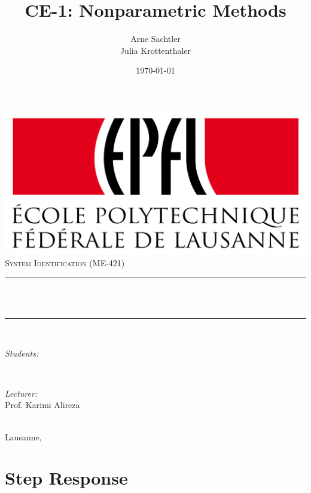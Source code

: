 \documentclass{scrartcl}
\begin{document}
\begin{titlepage}

\title{CE-1: Nonparametric Methods} %
\author{Arne Sachtler \\ Julia Krottenthaler}		%
\date{\today}								%

\makeatletter
\let\thetitle\@title
\let\theauthor\@author
\let\thedate\@date
\makeatother

\centering
\vspace*{0.5 cm}

    \includegraphics[width=0.7\linewidth]{figures/EPFL_Logo.png}\\[1.0 cm]	
	\textsc{\Large System Identification (ME-421)}\\[1.0cm]				
	\rule{\linewidth}{0.2 mm} \\[0.5 cm]
	{ \LARGE \thetitle}\\
	\rule{\linewidth}{0.2 mm} \\[1.5 cm]
	
    \vspace{1cm}
	\begin{minipage}{0.5\textwidth}
		\begin{flushleft} \large
			\emph{{Students}:}\\
			\theauthor
			\end{flushleft}
			\end{minipage}~
			\begin{minipage}{0.4\textwidth}
			\begin{flushright} \large
			\emph{{Lecturer}:} \\	
			Prof. Karimi Alireza  \\
		\end{flushright}
	\end{minipage}\\[1.2cm]
	{\vspace{3cm} \large Lausanne, \thedate}\\[1.5 cm]
	\vfill
\end{titlepage}
\tableofcontents
\section{Step Response}
\end{document}
